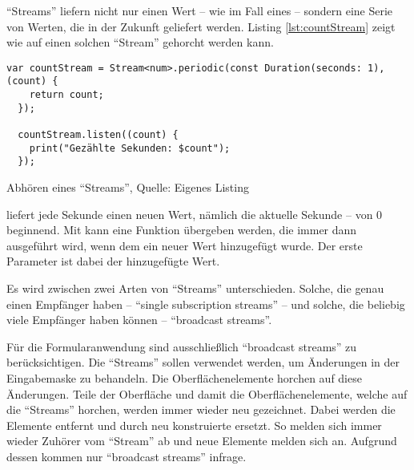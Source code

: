 \enquote{Streams} liefern nicht nur einen Wert -- wie im Fall eines  -- sondern eine Serie von Werten, die in der Zukunft geliefert werden.
Listing \ref{lst:countStream} zeigt wie auf einen solchen \enquote{Stream} gehorcht werden kann.
\ifIncludeFigures
  \begin{listing}[ht]
    \begin{verbatim}
var countStream = Stream<num>.periodic(const Duration(seconds: 1), (count) {
    return count;
  });

  countStream.listen((count) {
    print("Gezählte Sekunden: $count");
  });
\end{verbatim}
    \caption[Abhören eines \enquote{Streams}]{Abhören eines \enquote{Streams}, Quelle: Eigenes Listing}
    \label{lst:countStream}
  \end{listing}
\fi

 liefert jede Sekunde einen neuen Wert, nämlich die aktuelle Sekunde -- von 0 beginnend.
Mit  kann eine Funktion übergeben werden, die immer dann ausgeführt wird, wenn dem  ein neuer Wert hinzugefügt wurde.
Der erste Parameter ist dabei der hinzugefügte Wert.



Es wird zwischen zwei Arten von \enquote{Streams} unterschieden.
Solche, die genau einen Empfänger haben -- \enquote{single subscription streams} -- und solche, die beliebig viele Empfänger haben können -- \enquote{broadcast streams}.

Für die Formularanwendung sind ausschließlich \enquote{broadcast streams} zu berücksichtigen.
Die \enquote{Streams} sollen verwendet werden, um Änderungen in der Eingabemaske zu behandeln.
Die  Oberflächenelemente horchen auf diese Änderungen.
Teile der Oberfläche und damit die Oberflächenelemente, welche auf die \enquote{Streams} horchen, werden immer wieder neu gezeichnet.
Dabei werden die Elemente entfernt und durch neu konstruierte ersetzt.
So melden sich immer wieder Zuhörer vom \enquote{Stream} ab und neue Elemente melden sich an.
Aufgrund dessen kommen nur \enquote{broadcast streams} infrage.


